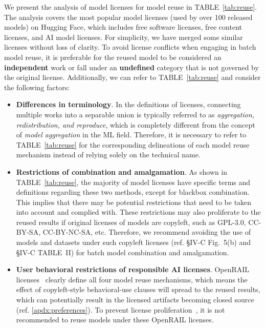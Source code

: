\documentclass[journal]{IEEEtran}
\begin{document}
We present the analysis of model licenses for model reuse in TABLE~\ref{tab:reuse}. 
The analysis covers the most popular model licenses (used by over 100 released models) on Hugging Face, which includes free software licenses, free content licenses, and AI model licenses.
For simplicity, we have merged some similar licenses without loss of clarity.
To avoid license conflicts when engaging in batch model reuse, it is preferable for the reused model to be considered an \textbf{independent} work or fall under an \textbf{undefined} category that is not governed by the original license.
Additionally, we can refer to TABLE~\ref{tab:reuse} and consider the following factors:
\begin{itemize}
  \item \textbf{Differences in terminology}. In the definitions of licenses, connecting multiple works into a separable union is typically referred to as \textit{aggregation, redistribution, and reproduce}, which is completely different from the concept of \textit{model aggregation} in the ML field. Therefore, it is necessary to refer to TABLE~\ref{tab:reuse} for the corresponding delineations of each model reuse mechanism instead of relying solely on the technical name.

  \item \textbf{Restrictions of combination and amalgamation}. As shown in TABLE~\ref{tab:reuse}, the majority of model licenses have specific terms and definitions regarding these two methods, except for blackbox combination. This implies that there may be potential restrictions that need to be taken into account and complied with.
  These restrictions may also proliferate to the reused results if original licenses of models are copyleft, such as GPL-3.0, CC-BY-SA, CC-BY-NC-SA, etc.
  Therefore, we recommend avoiding the use of models and datasets under such copyleft licenses (ref. \S{IV-C} Fig.~5(b) and \S{IV-C} TABLE~II) for batch model combination and amalgamation.

  \item \textbf{User behavioral restrictions of responsible AI licenses}. OpenRAIL licenses~\cite{contractor2022behavioral} clearly define all four model reuse mechanisms, which means the effect of copyleft-style behavioral-use clauses will spread to the reused results, which can potentially result in the licensed artifacts becoming closed source~\cite{greenbaum2016the} (ref. \ddag\ref{apdx:preferences}).
  To prevent license proliferation~\cite{gomulkiewicz2009open}, it is not recommended to reuse models under these OpenRAIL licenses.
\end{itemize}
\end{document}
